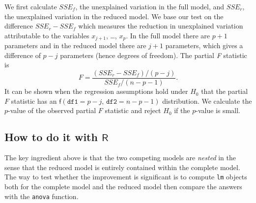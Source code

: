 \documentclass[captions=tableheading]{scrbook}
\begin{document}
We first calculate \(SSE_{f}\), the unexplained variation in the full model, and \(SSE_{r}\), the unexplained variation in the reduced model. We base our test on the difference \(SSE_{r}-SSE_{f}\) which measures the reduction in unexplained variation attributable to the variables \(x_{j+1}\), \ldots{}, \(x_{p}\). In the full model there are \(p+1\) parameters and in the reduced model there are \(j+1\) parameters, which gives a difference of \(p-j\) parameters (hence degrees of freedom). The partial \emph{F} statistic is 
\begin{equation}
F=\frac{(SSE_{r}-SSE_{f})/(p-j)}{SSE_{f}/(n-p-1)}.
\end{equation}
It can be shown when the regression assumptions hold under \(H_{0}\) that the partial \(F\) statistic has an \(\mathsf{f}(\mathtt{df1}=p-j,\,\mathtt{df2}=n-p-1)\) distribution. We calculate the \(p\)-value of the observed partial \(F\) statistic and reject \(H_{0}\) if the \(p\)-value is small. 
\subsection{How to do it with \(\mathsf{R}\)}
\label{sec-12-7-1}


The key ingredient above is that the two competing models are \emph{nested} in the sense that the reduced model is entirely contained within the complete model. The way to test whether the improvement is significant is to compute \texttt{lm} objects both for the complete model and the reduced model then compare the answers with the \texttt{anova} function.
\end{document}
